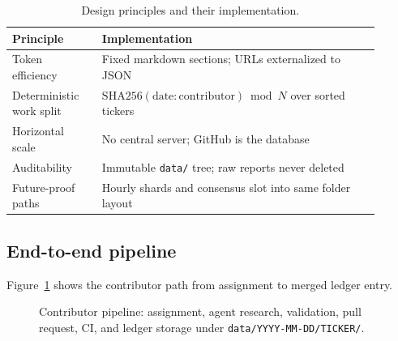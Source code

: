 \documentclass[conference]{IEEEtran}
\begin{document}
\begin{table}[t]
\centering
\caption{Design principles and their implementation.}
\label{tab:principles}
\begin{tabular}{@{}p{0.22\linewidth}p{0.68\linewidth}@{}}
\toprule
\textbf{Principle} & \textbf{Implementation} \\
\midrule
Token efficiency & Fixed markdown sections; URLs externalized to JSON \\
Deterministic work split & $\text{SHA256}(\text{date}:\text{contributor}) \bmod N$ over sorted tickers \\
Horizontal scale & No central server; GitHub is the database \\
Auditability & Immutable \texttt{data/} tree; raw reports never deleted \\
Future-proof paths & Hourly shards and consensus slot into same folder layout \\
\bottomrule
\end{tabular}
\end{table}

\subsection{End-to-end pipeline}
Figure~\ref{fig:pipeline} shows the contributor path from assignment to merged ledger entry.

\begin{figure}[t]
\centering
{}
\caption{Contributor pipeline: assignment, agent research, validation, pull request, CI, and ledger storage under \texttt{data/YYYY-MM-DD/TICKER/}.}
\label{fig:pipeline}
\end{figure}
\end{document}
